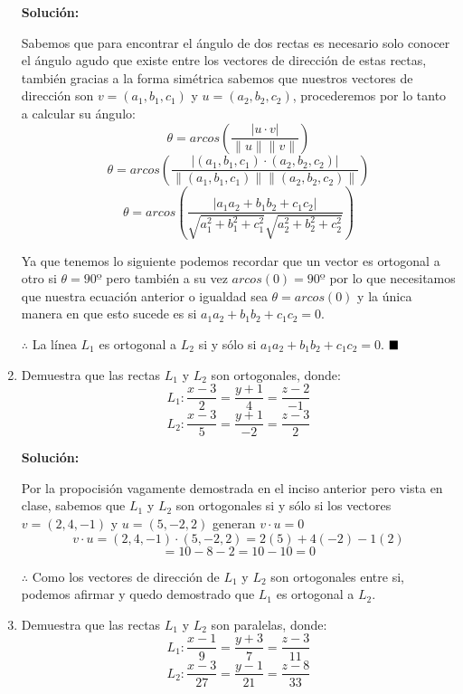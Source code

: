 \documentclass{article}
\begin{document}
\begin{enumerate}
    \textbf{Solución:}
    \vspace{10pt}

    Sabemos que para encontrar el ángulo de dos rectas es necesario solo conocer el ángulo agudo que existe entre los vectores de dirección de estas rectas, 
    también gracias a la forma simétrica sabemos que nuestros vectores de dirección son $v = (a_1,b_1,c_1)$ y $u = (a_2,b_2,c_2)$, procederemos por lo tanto 
    a calcular su ángulo:
    $$\theta = arcos\left(\frac{\left|u \cdot v \right|}{\|u\| \|v\|}\right)$$
    $$\theta = arcos\left(\frac{\left|(a_1,b_1,c_1) \cdot (a_2,b_2,c_2)\right|}{\|(a_1,b_1,c_1)\| \|(a_2,b_2,c_2)\|}\right)$$
    $$\theta = arcos\left(\frac{\left|a_1a_2+b_1b_2+c_1c_2 \right|}{\sqrt{a^2_1+b^2_1+c^2_1}\sqrt{a^2_2+b^2_2+c^2_2}}\right)$$
    
    Ya que tenemos lo siguiente podemos recordar que un vector es ortogonal a otro si $\theta = 90º$ pero también a su vez $arcos(0) = 90º$ por lo que necesitamos que nuestra 
    ecuación anterior o igualdad sea $\theta = arcos(0)$ y la única manera en que esto sucede es si $a_1a_2+b_1b_2+c_1c_2 = 0$.
    
    $\therefore$ La línea $L_1$ es ortogonal a $L_2$ si y sólo si $a_1a_2+b_1b_2+c_1c_2 = 0$. 
    $\hfill\blacksquare$

    \item Demuestra que las rectas $L_1$ y $L_2$ son ortogonales, donde:
    $$L_1 : \frac{x-3}{2} = \frac{y+1}{4} = \frac{z-2}{-1}$$
    $$L_2 : \frac{x-3}{5} = \frac{y+1}{-2} = \frac{z-3}{2}$$
    \vspace{10pt}

    \textbf{Solución:}
    \vspace{10pt}

    Por la propocisión vagamente demostrada en el inciso anterior pero vista en clase, sabemos que $L_1$ y $L_2$ son ortogonales si y sólo si los vectores 
    $v = (2, 4, -1)$ y $u =(5,-2,2) $  generan $v \cdot u = 0$
    $$v \cdot u = (2, 4, -1) \cdot (5,-2,2) = 2(5)+4(-2)-1(2)$$
    $$= 10-8 -2 = 10 -10 = 0$$

    $\therefore$ Como los vectores de dirección de $L_1$ y $L_2$ son ortogonales entre si, podemos afirmar y quedo demostrado que $L_1$ es ortogonal a $L_2$.

    \item Demuestra que las rectas $L_1$ y $L_2$ son paralelas, donde:
    $$L_1 : \frac{x-1}{9} = \frac{y+3}{7} = \frac{z-3}{11}$$
    $$L_2: \frac{x-3}{27}= \frac{y-1}{21} = \frac{z-8}{33}$$
    \vspace{10pt}


\end{enumerate}
\end{document}
